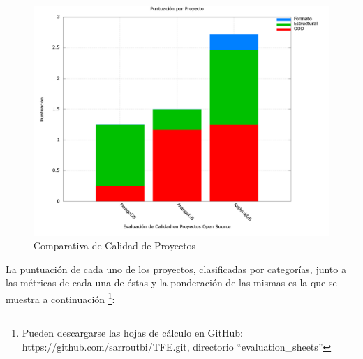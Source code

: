 \documentclass[11pt]{article}
\begin{document}
\begin{center}
 \begin{figure}[H]
 \begin{center}
   \includegraphics[width=16cm]{img/quality_evaluations.png}
   \caption{Comparativa de Calidad de Proyectos}
   \label{fig:quality_comparison}
 \end{center}
 \end{figure}
\end{center}

La puntuación de cada uno de los proyectos, clasificadas por categorías, junto a las métricas de cada una de éstas y la ponderación de las mismas es la que se muestra a continuación \footnote{Pueden descargarse las hojas de cálculo en GitHub: https://github.com/sarroutbi/TFE.git, directorio ``evaluation\_sheets'' }:
\end{document}
